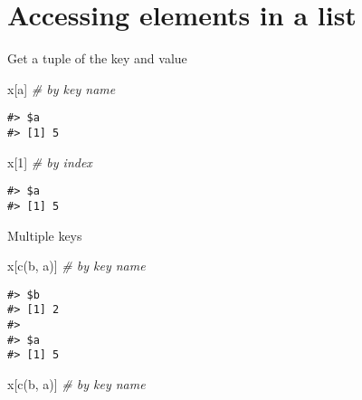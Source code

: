 \documentclass[
]{book}
\newenvironment{Shaded}{\begin{snugshade}}{\end{snugshade}}
\newcommand{\CommentTok}[1]{\textcolor[rgb]{0.56,0.35,0.01}{\textit{#1}}}
\newcommand{\DecValTok}[1]{\textcolor[rgb]{0.00,0.00,0.81}{#1}}
\newcommand{\FunctionTok}[1]{\textcolor[rgb]{0.00,0.00,0.00}{#1}}
\newcommand{\NormalTok}[1]{#1}
\newcommand{\StringTok}[1]{\textcolor[rgb]{0.31,0.60,0.02}{#1}}
\begin{document}
\hypertarget{accessing-elements-in-a-list}{%
\section{Accessing elements in a list}\label{accessing-elements-in-a-list}}

Get a tuple of the key and value

\begin{Shaded}
\begin{Highlighting}[]
\NormalTok{x[}\StringTok{\textquotesingle{}a\textquotesingle{}}\NormalTok{] }\CommentTok{\# by key name}
\end{Highlighting}
\end{Shaded}

\begin{verbatim}
#> $a
#> [1] 5
\end{verbatim}

\begin{Shaded}
\begin{Highlighting}[]
\NormalTok{x[}\DecValTok{1}\NormalTok{]   }\CommentTok{\# by index}
\end{Highlighting}
\end{Shaded}

\begin{verbatim}
#> $a
#> [1] 5
\end{verbatim}

Multiple keys

\begin{Shaded}
\begin{Highlighting}[]
\NormalTok{x[}\FunctionTok{c}\NormalTok{(}\StringTok{\textquotesingle{}b\textquotesingle{}}\NormalTok{, }\StringTok{\textquotesingle{}a\textquotesingle{}}\NormalTok{)] }\CommentTok{\# by key name}
\end{Highlighting}
\end{Shaded}

\begin{verbatim}
#> $b
#> [1] 2
#> 
#> $a
#> [1] 5
\end{verbatim}

\begin{Shaded}
\begin{Highlighting}[]
\NormalTok{x[}\FunctionTok{c}\NormalTok{(}\StringTok{\textquotesingle{}b\textquotesingle{}}\NormalTok{, }\StringTok{\textquotesingle{}a\textquotesingle{}}\NormalTok{)] }\CommentTok{\# by key name}
\end{Highlighting}
\end{Shaded}
\end{document}
